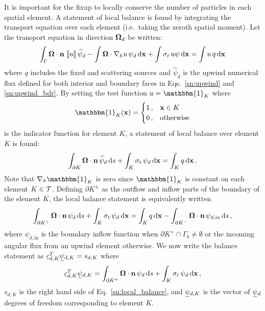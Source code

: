 \documentclass[../doc.tex]{subfiles}
\begin{document}
It is important for the fixup to locally conserve the number of particles in each spatial element. A statement of local balance is found by integrating the transport equation over each element (i.e.~taking the zeroth spatial moment). Let the transport equation in direction $\boldsymbol{\Omega}_d$ be written: 
	\begin{equation}
		\int_{\Gamma} \boldsymbol{\Omega}\cdot\boldsymbol{\mathrm{n}}\,\left\llbracket u \right\rrbracket \widehat{\psi}_d - \int \boldsymbol{\Omega}\cdot\nabla_h u\, \psi_d \mathop{}\!\mathrm{d} \boldsymbol{\mathrm{x}} + \int \sigma_t\, u \psi \mathop{}\!\mathrm{d} \boldsymbol{\mathrm{x}} = \int u\, q \mathop{}\!\mathrm{d} \boldsymbol{\mathrm{x}} 
	\end{equation}
where $q$ includes the fixed and scattering sources and $\widehat{\psi}_d$ is the upwind numerical flux defined for both interior and boundary faces in Eqs.~\ref{sn:upwind} and \ref{sn:upwind_bdr}. By setting the test function $u = \mathbbm{1}_K$ where 
	\begin{equation}
		\mathbbm{1}_{K}(\x) = \begin{cases} 
			1 \,, & \x \in K \\ 
			0 \,, & \text{otherwise} 
		\end{cases}
	\end{equation}
is the indicator function for element $K$, a statement of local balance over element $K$ is found: 
	\begin{equation}
		\int_{\partial K} \boldsymbol{\Omega}\cdot\boldsymbol{\mathrm{n}}\,\widehat{\psi}_d \mathop{}\!\mathrm{d} s + \int_K \sigma_t\, \psi_d \mathop{}\!\mathrm{d} \boldsymbol{\mathrm{x}} = \int_K q \mathop{}\!\mathrm{d} \boldsymbol{\mathrm{x}} \,. 
	\end{equation}
Note that $\nablah \mathbbm{1}_K$ is zero since $\mathbbm{1}_K$ is constant on each element $K \in \mathcal{T}$. Defining $\partial K^\pm$ as the outflow and inflow parts of the boundary of the element $K$, the local balance statement is equivalently written 
	\begin{equation} \label{sn:local_balance}
		\int_{\partial K^+} \boldsymbol{\Omega}\cdot\boldsymbol{\mathrm{n}}\, \psi_d \mathop{}\!\mathrm{d} s + \int_K \sigma_t\, \psi_d \mathop{}\!\mathrm{d} \boldsymbol{\mathrm{x}} = \int_K q \mathop{}\!\mathrm{d} \boldsymbol{\mathrm{x}} - \int_{\partial K^-} \boldsymbol{\Omega}\cdot\boldsymbol{\mathrm{n}}\,\psi_{d,\text{in}} \mathop{}\!\mathrm{d} s \,, 
	\end{equation}
where $\psi_{d,\text{in}}$ is the boundary inflow function when $\partial K^+ \cap \Gamma_b \neq \emptyset$ or the incoming angular flux from an upwind element otherwise. We now write the balance statement as $\ubar{c}_{d,K}^T \ubar{\psi}_{d,K} = s_{d,K}$ where 
	\begin{equation}
	 	\ubar{c}_{d,K}^T \ubar{\psi}_{d,K} = \int_{\partial K^+} \Omegahat\cdot\n\, \psi_d \ud s + \int_K \sigma_t\, \psi_d \ud \x \,,
	\end{equation} 
$s_{d,K}$ is the right hand side of Eq.~\ref{sn:local_balance}, and $\ubar{\psi}_{d,K}$ is the vector of $\ubar{\psi}_d$ degrees of freedom corresponding to element $K$. 
\end{document}
